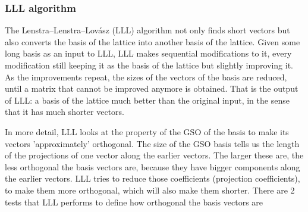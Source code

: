 \subsubsection{LLL algorithm}
\label{sec:LLLalgorithm}
The Lenstra–Lenstra–Lovász (LLL) algorithm not only finds short vectors but also
converts the basis of the lattice into another basis of the lattice. Given
some long basis as an input to LLL, LLL makes sequential
modifications to it, every modification still keeping it as the basis of the
lattice but slightly improving it. As the improvements repeat, the sizes
of the vectors of the basis are reduced, until a matrix that
cannot be improved anymore is obtained. That is the output of LLL: a basis of the lattice
much better than the original input, in the sense that it has much
shorter vectors.

In more detail, LLL looks at the property of the GSO of the basis to make its vectors 'approximately' orthogonal. The size of the GSO basis tells us the
length of the projections of one vector along the earlier vectors. The larger
these are, the less orthogonal the basis vectors are, because they have bigger
components along the earlier vectors. LLL tries to reduce those coefficients
(projection coefficients), to make them more orthogonal, which will also make
them shorter. There are 2 tests that LLL performs to define how orthogonal the basis
vectors are

